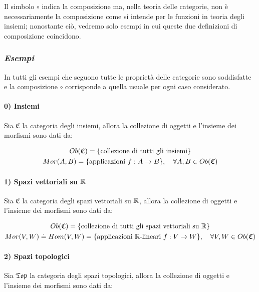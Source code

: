 Il simbolo $ \circ $ indica la composizione ma, nella teoria delle categorie, non è necessariamente la composizione come si intende per le funzioni in teoria degli insiemi; nonostante ciò, vedremo solo esempi in cui queste due definizioni di composizione coincidono.

\subsubsection{\textit{Esempi}}

In tutti gli esempi che seguono tutte le proprietà delle categorie sono soddisfatte e la composizione $ \circ $ corrisponde a quella usuale per ogni caso considerato.

\paragraph{0) Insiemi}

Sia $ \mathfrak{C} $ la categoria degli insiemi, allora la collezione di oggetti e l'insieme dei morfismi sono dati da:

\begin{gather}
	Ob(\mathfrak{C}) = \{ \text{collezione di tutti gli insiemi} \}\\
	Mor(A,B) = \{ \text{applicazioni } f : A \to B \} \qcomma \forall A,B \in Ob(\mathfrak{C})
\end{gather}

\paragraph{1) Spazi vettoriali su $ \mathbb{R} $}

Sia $ \mathfrak{C} $ la categoria degli spazi vettoriali su $ \mathbb{R} $, allora la collezione di oggetti e l'insieme dei morfismi sono dati da:

\begin{gather}
	Ob(\mathfrak{C}) = \{ \text{collezione di tutti gli spazi vettoriali su } \R \}\\
	Mor(V,W) \doteq Hom(V,W) = \{ \text{applicazioni $ \R $-lineari } f : V \to W \} \qcomma \forall V,W \in Ob(\mathfrak{C})
\end{gather}

\paragraph{2) Spazi topologici}

Sia $ \mathfrak{Top} $ la categoria degli spazi topologici, allora la collezione di oggetti e l'insieme dei morfismi sono dati da:


